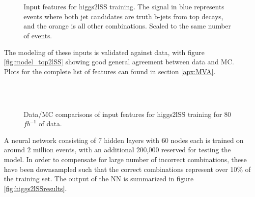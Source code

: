 \begin{figure}[h!]
    \\
    \\
    \caption{Input features for higgs2lSS training. The signal in blue represents events where both jet candidates are truth b-jets from top decays, and the orange is all other combinations. Scaled to the same number of events.}
    \label{fig:features_higgs2lSS}
\end{figure}

The modeling of these inputs is validated against data, with figure \ref{fig:model_top2lSS} showing good general agreement between data and MC. Plots for the complete list of features can found in section \ref{apx:MVA}.

\begin{figure}[h!]
    \\
    \\
    \caption{Data/MC comparisons of input features for higgs2lSS training for 80 $fb^{-1}$ of data.}
    \label{fig:model_higgs2lSS}
\end{figure}

A neural network consisting of 7 hidden layers with 60 nodes each is trained on around 2 million events, with an additional 200,000 reserved for testing the model. In order to compensate for large number of incorrect combinations, these have been downsampled such that the correct combinations represent over 10\% of the training set. The output of the NN is summarized in figure \ref{fig:higgs2lSSresults}.

